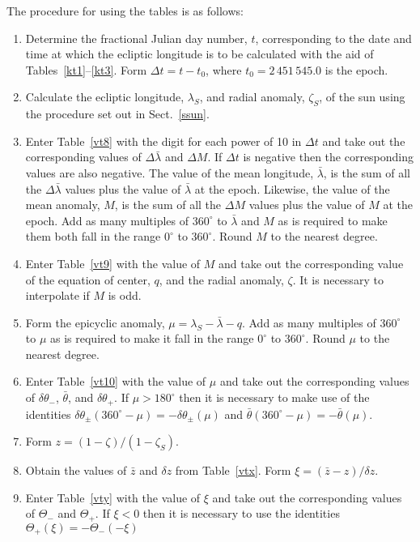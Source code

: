 The procedure for using the tables is as follows:
\begin{enumerate}
\item Determine the fractional Julian day number, $t$, corresponding to the date and time
at which the ecliptic longitude is to be calculated with the aid of Tables~\ref{kt1}--\ref{kt3}. Form $\Delta t = t-t_0$, where $t_0=2\,451\,545.0$ is the epoch. 
\item Calculate the ecliptic longitude, $\lambda_S$, and radial anomaly,
$\zeta_S$, of the sun using the procedure set out in Sect.~\ref{ssun}.
\item Enter Table~\ref{vt8} with the digit for each power of 10
in ${\Delta} t$ and take out the corresponding values of $\Delta\bar{\lambda}$ and $\Delta M$. If $\Delta t$ is negative then the corresponding
values are also negative.
The value of the mean longitude, $\bar{\lambda}$, is the
sum of all the $\Delta\bar{\lambda}$ values plus the value of $\bar{\lambda}$ at the epoch. Likewise, the value of the mean anomaly, $M$, is
the sum of all the $\Delta M$ values plus the value of $M$ at the epoch. 
Add as many multiples of $360^\circ$ to $\bar{\lambda}$ and $M$
as is required to make them both fall in the range $0^\circ$ to $360^\circ$. Round $M$ to the nearest degree. 
\item Enter Table~\ref{vt9} with the value of $M$ and take out the
corresponding value of the equation of center, $q$, and the radial anomaly, $\zeta$. It is necessary to interpolate if $M$ is odd.
\item Form the epicyclic anomaly, $\mu = \lambda_S-\bar{\lambda}-q$. Add as many multiples of $360^\circ$ to $\mu$ as is required to make it fall in the range $0^\circ$ to $360^\circ$. Round $\mu$ to the nearest degree.
\item Enter Table~\ref{vt10} with the value of $\mu$ and take
out the corresponding values of $\delta\theta_-$, $\bar{\theta}$, and
$\delta\theta_+$. If $\mu > 180^\circ$ then it is necessary to make use
of the identities $\delta\theta_\pm(360^\circ - \mu) =-\delta\theta_\pm(\mu)$
and $\bar{\theta}(360^\circ - \mu) =-\bar{\theta}(\mu)$.
\item Form $z = (1-\zeta)/(1-\zeta_S)$.
\item Obtain the values of $\bar{z}$ and $\delta z$ from Table~\ref{vtx}.
Form $\xi = (\bar{z}-z)/\delta z$.
\item Enter Table~\ref{vty} with the value of $\xi$ and take out
the corresponding values of $\Theta_-$ and $\Theta_+$. If $\xi<0$ then
it is necessary to use the identities $\Theta_+(\xi)=-\Theta_-(-\xi)$

\end{enumerate}
